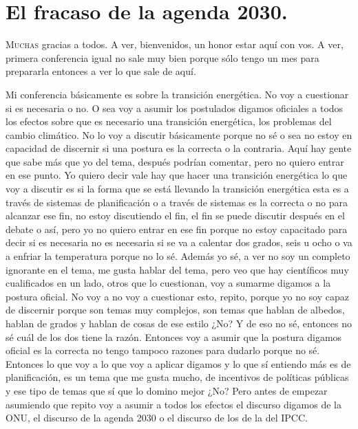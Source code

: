 \chapter{El fracaso de la agenda 2030.}


\lettrine[lines=2, findent=3pt, nindent=0pt]{M}{uchas} gracias a todos. A ver, bienvenidos, un honor estar aquí con vos. A ver, primera conferencia igual no sale muy bien porque sólo tengo un mes para prepararla entonces a ver lo que sale de aquí.

Mi conferencia básicamente es sobre la transición energética. No voy a cuestionar si es necesaria o no. O sea voy a asumir los postulados digamos oficiales a todos los efectos sobre que es necesario una transición energética, los problemas del cambio climático. No lo voy a discutir básicamente porque no sé o sea no estoy en capacidad de discernir si una postura es la correcta o la contraria. Aquí hay gente que sabe más que yo del tema, después podrían comentar, pero no quiero entrar en ese punto. Yo quiero decir vale hay que hacer una transición energética lo que voy a discutir es si la forma que se está llevando la transición energética esta es a través de sistemas de planificación o a través de sistemas es la correcta o no para alcanzar ese fin, no estoy discutiendo el fin, el fin se puede discutir después en el debate o así, pero yo no quiero entrar en ese fin porque no estoy capacitado para decir si es necesaria no es necesaria si se va a calentar dos grados, seis u ocho o va a enfriar la temperatura porque no lo sé. Además yo sé, a ver no soy un completo ignorante en el tema, me gusta hablar del tema, pero veo que hay científicos muy cualificados en un lado, otros que lo cuestionan, voy a sumarme digamos a la postura oficial. No voy a no voy a cuestionar esto, repito, porque yo no soy capaz de discernir porque son temas muy complejos, son temas que hablan de albedos, hablan de grados y hablan de cosas de ese estilo ¿No? Y de eso no sé, entonces no sé cuál de los dos tiene la razón. Entonces voy a asumir que la postura digamos oficial es la correcta no tengo tampoco razones para dudarlo porque no sé. Entonces lo que voy a lo que voy a aplicar digamos y lo que sí entiendo más es de planificación, es un tema que me gusta mucho, de incentivos de políticas públicas y ese tipo de temas que sí que lo domino mejor ¿No? Pero antes de empezar asumiendo que repito voy a asumir a todos los efectos el discurso digamos de la ONU, el discurso de la agenda 2030 o el discurso de los de la del IPCC.


